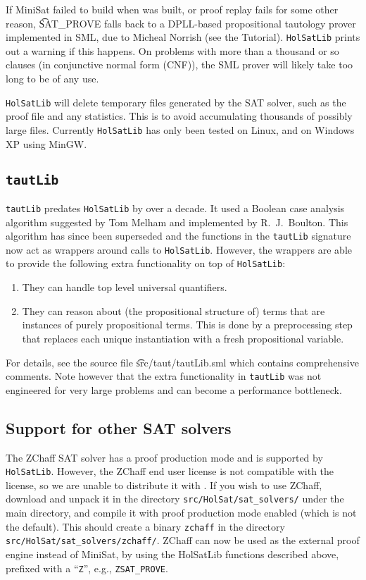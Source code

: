 If MiniSat failed to build when \HOL{} was built, or proof replay fails for some other reason, \t{SAT\_PROVE} falls back to a DPLL-based propositional tautology prover implemented in SML, due to Micheal Norrish (see the \HOL{} Tutorial). {\tt{HolSatLib}} prints out a warning if this happens. On problems with more than a thousand or so clauses (in conjunctive normal form (CNF)), the SML prover will likely take too long to be of any use.

{\tt{HolSatLib}} will delete temporary files generated by the SAT solver, such as the proof file and any statistics. This is to avoid accumulating thousands of possibly large files. Currently {\tt HolSatLib} has only been tested on Linux, and on Windows XP using MinGW.

\subsection{{\tt tautLib}}\label{tautlib}

{\tt tautLib} predates {\tt{HolSatLib}} by over a decade. It used a Boolean case analysis algorithm suggested by Tom Melham and implemented by R.~J.~Boulton. This algorithm has since been superseded and the functions in the {\tt tautLib} signature now act as wrappers around calls to {\tt{HolSatLib}}. However, the wrappers are able to provide the following extra functionality on top of {\tt{HolSatLib}}:

\begin{enumerate}
\item They can handle top level universal quantifiers.
\item They can reason about (the propositional structure of) terms that are instances of purely propositional terms. This is done by a preprocessing step that replaces each unique instantiation with a fresh propositional variable.
\end{enumerate}

For details, see the source file \t{src/taut/tautLib.sml} which contains comprehensive comments. Note however that the extra functionality in {{\tt tautLib}} was not engineered for very large problems and can become a performance bottleneck.

\subsection{Support for other SAT solvers}\label{subsec:hs_zchaff}

The ZChaff SAT solver has a proof production mode and is supported by {\tt{HolSatLib}}. However, the ZChaff end user license is not compatible with the \HOL{} license, so we are unable to distribute it with \HOL{}. If you wish to use ZChaff, download and unpack it in the directory {\tt src/HolSat/sat\_solvers/} under the main \HOL{} directory, and compile it with proof production mode enabled (which is not the default). This should create a binary {\tt zchaff} in the directory {\tt src/HolSat/sat\_solvers/zchaff/}. ZChaff can now be used as the external proof engine instead of MiniSat, by using the HolSatLib functions described above, prefixed with a ``{\tt Z}'', e.g., {\tt ZSAT\_PROVE}.

